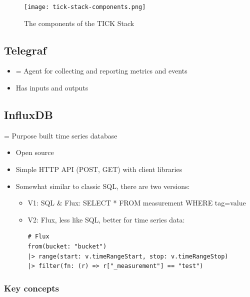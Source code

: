 \documentclass{article}
\begin{document}
\begin{figure}[H]
    \centering
    \texttt{[image: tick-stack-components.png]}
    \caption{The components of the TICK Stack}
\end{figure}

\subsection{Telegraf}

\begin{itemize}
    \item = Agent for collecting and reporting metrics and events
    \item Has inputs and outputs
\end{itemize}

\subsection{InfluxDB}

= Purpose built time series database

\begin{itemize}
    \item Open source
    \item Simple HTTP API (POST, GET) with client libraries
    \item Somewhat similar to classic SQL, there are two versions:
    \begin{itemize}
        \item V1: SQL \& Flux: SELECT * FROM measurement WHERE tag=value
        \item V2: Flux, less like SQL, better for time series data:
\begin{verbatim}
# Flux
from(bucket: "bucket")
|> range(start: v.timeRangeStart, stop: v.timeRangeStop)
|> filter(fn: (r) => r["_measurement"] == "test")
\end{verbatim}
    \end{itemize}
\end{itemize}

\subsubsection{Key concepts}
\end{document}
